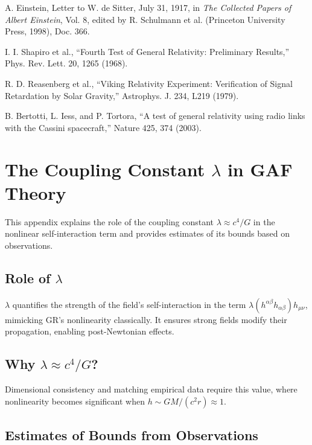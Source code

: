 \documentclass{article}
\begin{document}
\begin{thebibliography}{9}
A. Einstein, Letter to W. de Sitter, July 31, 1917, in \textit{The Collected Papers of Albert Einstein}, Vol. 8, edited by R. Schulmann et al. (Princeton University Press, 1998), Doc. 366.

I. I. Shapiro et al., ``Fourth Test of General Relativity: Preliminary Results,'' Phys. Rev. Lett. 20, 1265 (1968).

R. D. Reasenberg et al., ``Viking Relativity Experiment: Verification of Signal Retardation by Solar Gravity,'' Astrophys. J. 234, L219 (1979).

B. Bertotti, L. Iess, and P. Tortora, ``A test of general relativity using radio links with the Cassini spacecraft,'' Nature 425, 374 (2003).

\end{thebibliography}

\appendix

\section{The Coupling Constant \(\lambda\) in GAF Theory}

This appendix explains the role of the coupling constant \(\lambda \approx c^4 / G\) in the nonlinear self-interaction term and provides estimates of its bounds based on observations.

\subsection{Role of \(\lambda\)}

\(\lambda\) quantifies the strength of the field's self-interaction in the term \(\lambda (h^{\alpha\beta} h_{\alpha\beta}) h_{\mu\nu}\), mimicking GR's nonlinearity classically. It ensures strong fields modify their propagation, enabling post-Newtonian effects.

\subsection{Why \(\lambda \approx c^4 / G\)?}

Dimensional consistency and matching empirical data require this value, where nonlinearity becomes significant when \(h \sim GM/(c^2 r) \approx 1\).

\subsection{Estimates of Bounds from Observations}
\end{document}

